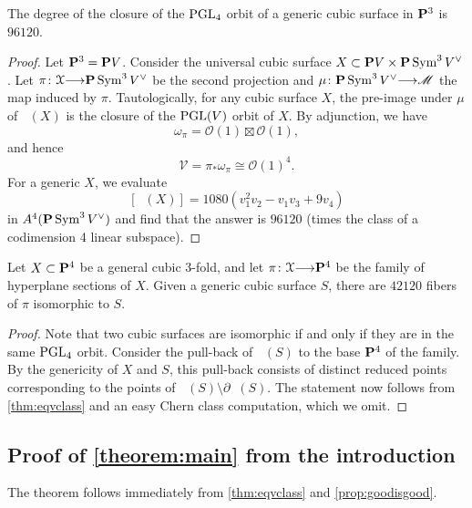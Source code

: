 \documentclass[11pt,reqno, letterpaper]{amsart}
\DeclareMathOperator{\Orb}{\overline{Orb}}
\renewcommand{\to}{{\longrightarrow}}
\numberwithin{equation}{section}
\renewcommand{\O}{\mathcal O}
\begin{document}
\begin{corollary}
  The degree of the closure of the $\PGL_4$ orbit of a generic cubic surface in $\P^3$ is $96120$.
\end{corollary}
\begin{proof}
  Let $\P^3 = \P V$.
  Consider the universal cubic surface $X \subset \P V\times \P \Sym^3 V^\vee$.
  Let $\pi \colon \mathcal X \to \P \Sym^3 V^\vee$ be the second projection and $\mu \colon \P \Sym^3 V^\vee \to \mathscr M$ the map induced by $\pi$.
  Tautologically, for any cubic surface $X$, the pre-image under $\mu$ of $\Orb(X)$ is the closure of the $\PGL(V)$ orbit of $X$.
  By adjunction, we have
  \[ \omega_\pi = \O(1) \boxtimes \O(1),\]
  and hence
  \[ \mathcal V = \pi_* \omega_\pi \cong \O(1)^4.\]
  For a generic $X$, we evaluate 
  \[ [\Orb(X)] = 1080(v_1^2v_2 - v_1v_3+9v_4)\]
  in $A^4(\P \Sym^3V^\vee)$ and find that the answer is $96120$ (times the class of a codimension 4 linear subspace).
\end{proof}

\begin{corollary}
  Let $X \subset \P^4$ be a general cubic 3-fold, and let $\pi \colon \mathcal X \to \P^4$ be the family of hyperplane sections of $X$.
  Given a generic cubic surface $S$, there are $42120$ fibers of $\pi$ isomorphic to $S$.
\end{corollary}
\begin{proof}
  Note that two cubic surfaces are isomorphic if and only if they are in the same $\PGL_4$ orbit.
  Consider the pull-back of $\Orb(S)$ to the base $\P^4$ of the family.
  By the genericity of $X$ and $S$, this pull-back consists of distinct reduced points corresponding to the points of $\Orb(S) \setminus \partial \Orb(S)$.
  The statement now follows from \autoref{thm:eqvclass} and an easy Chern class computation, which we omit.
\end{proof}

\subsection{Proof of \texorpdfstring{\autoref{theorem:main}}{first theorem} from the introduction}
The theorem follows immediately from \autoref{thm:eqvclass} and \autoref{prop:goodisgood}.
\end{document}
